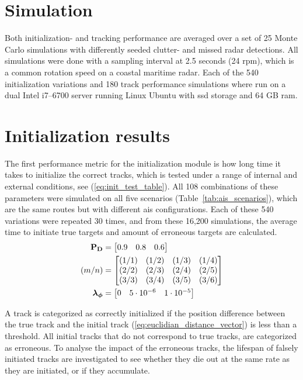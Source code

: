 \section{Simulation}
Both initialization- and tracking performance are averaged over a set of 25 Monte Carlo simulations with differently seeded clutter- and missed radar detections. All simulations were done with a sampling interval at 2.5 seconds (24 \gls{rpm}), which is a common rotation speed on a coastal maritime radar. Each of the 540 initialization variations and 180 track performance simulations where run on a dual Intel i7--6700 server running Linux Ubuntu with \gls{ssd} storage and 64 GB \gls{ram}.

\section{Initialization results}
The first performance metric for the initialization module is how long time it takes to initialize the correct tracks, which is tested under a range of internal and external conditions, see (\ref{eq:init_test_table}). All 108 combinations of these parameters were simulated on all five scenarios (Table~\ref{tab:ais_scenarios}), which are the same routes but with different \gls{ais} configurations. Each of these 540 variations were repeated 30 times, and from these 16,200 simulations, the average time to initiate true targets and amount of erroneous targets are calculated.
\begin{equation}\label{eq:init_test_table}
\begin{split}
\boldsymbol{\mathbf{P_D}} &= \begin{bmatrix} 0.9 & 0.8 & 0.6 \end{bmatrix} \\
(m/n) &= \begin{bmatrix} 	(1/1) & (1/2) & (1/3) & (1/4) \\
							(2/2) & (2/3) & (2/4) & (2/5) \\
							(3/3) & (3/4) & (3/5) & (3/6)
		   \end{bmatrix} \\
\boldsymbol{\mathbf{\lambda_\phi}} &= \begin{bmatrix} 0 & 5\cdot10^{-6} & 1\cdot10^{-5}\end{bmatrix}
\end{split}
\end{equation}

A track is categorized as correctly initialized if the position difference between the true track and the initial track (\ref{eq:euclidian_distance_vector}) is less than a threshold. All initial tracks that do not correspond to true tracks, are categorized as erroneous. To analyse the impact of the erroneous tracks, the lifespan of falsely initiated tracks are investigated to see whether they die out at the same rate as they are initiated, or if they accumulate.

